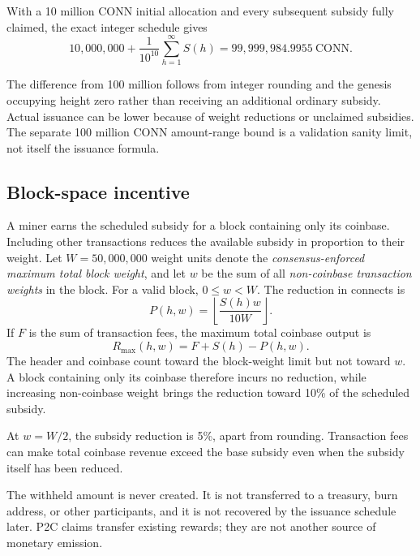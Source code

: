 \documentclass[11pt,a4paper]{article}
\newcommand{\CONN}{\mathrm{CONN}}
\begin{document}
\begin{samepage}
With a 10 million CONN initial allocation and every subsequent subsidy fully
claimed, the exact integer schedule gives
\begin{equation}
 10{,}000{,}000+
 \frac{1}{10^{10}}\sum_{h=1}^{\infty}S(h)
 =99{,}999{,}984.9955\ \CONN.
 \label{eq:issuance}
\end{equation}
\end{samepage}
The difference from 100 million follows from integer rounding and the genesis
occupying height zero rather than receiving an additional ordinary subsidy.
Actual issuance can be lower because of weight reductions or unclaimed
subsidies. The separate 100 million CONN amount-range bound is a validation
sanity limit, not itself the issuance formula.

\subsection*{Block-space incentive}

A miner earns the scheduled subsidy for a block containing only its coinbase.
Including other transactions reduces the available subsidy in proportion to
their weight. Let $W=50{,}000{,}000$ weight units denote the
\emph{consensus-enforced maximum total block weight}, and let $w$ be the sum
of all \emph{non-coinbase transaction weights} in the block. For a valid block,
$0\leq w<W$. The reduction in connects is
\begin{equation}
 P(h,w)=\left\lfloor
     \frac{S(h)w}{10W}
 \right\rfloor.
 \label{eq:penalty}
\end{equation}
If $F$ is the sum of transaction fees, the maximum total coinbase output is
\begin{equation}
 R_{\max}(h,w)=F+S(h)-P(h,w).
 \label{eq:reward}
\end{equation}
The header and coinbase count toward the block-weight limit but not toward
$w$. A block containing only its coinbase therefore incurs no reduction,
while increasing non-coinbase weight brings the reduction toward 10\% of the
scheduled subsidy.

At $w=W/2$, the subsidy reduction is 5\%, apart from rounding. Transaction fees can
make total coinbase revenue exceed the base subsidy even when the subsidy
itself has been reduced.

The withheld amount is never created. It is not transferred to a treasury,
burn address, or other participants, and it is not recovered by the issuance
schedule later. P2C claims transfer existing rewards; they are not another
source of monetary emission.
\end{document}
